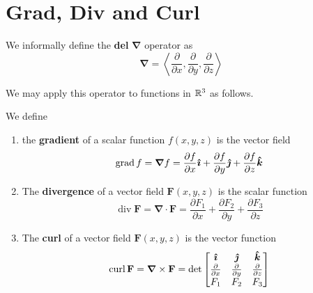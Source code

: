 \chapter{Grad, Div and Curl}
\begin{definition}
	We informally define the \textbf{del} $\bm{\nabla}$ operator as
	\[
		\bm{\nabla} = \left\langle \frac{\partial }{\partial x} , \frac{\partial }{\partial y} , \frac{\partial }{\partial z}  \right\rangle 
	\] 
\end{definition}
We may apply this operator to functions in $\mathbb{R}^{3}$ as follows.
\begin{definition}
	We define 
	\begin{enumerate}[label=\alph*.]
		\item the \textbf{gradient} of a scalar function $f(x,y,z)$ is the vector field 
			\[
			\operatorname{grad} f = \bm{\nabla} f= \frac{\partial f}{\partial x}\bm {\hat \imath} + \frac{\partial f}{\partial y} \bm {\hat \jmath} + \frac{\partial f}{\partial z} \bm {\hat k} 
			\] 
		\item The \textbf{divergence} of a vector field $\mathbf{F}(x,y,z)$ is the scalar function
			\[
				\operatorname{div} \mathbf{F} = \bm{\nabla}\cdot\mathbf{F} = \frac{\partial F_1}{\partial x} + \frac{\partial F_2}{\partial y} + \frac{\partial F_3}{\partial z} 
			\] 
		\item The \textbf{curl} of a vector field $\mathbf{F} (x,y,z)$ is the vector function 
			\[
				\operatorname{curl}\mathbf{F} = \bm{\nabla}\times \mathbf{F} 
				= \operatorname{det} 
				\begin{bmatrix}
					\bm {\hat \imath} & \bm {\hat \jmath} & \bm {\hat k}\\
					\frac{\partial }{\partial x} & \frac{\partial }{\partial y} & \frac{\partial}{\partial z} \\
					F_1 & F_2 & F_3
				\end{bmatrix}
			\] 
	\end{enumerate}
\end{definition}

